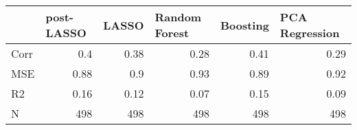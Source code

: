 
  \centering
    \begin{tabular}{lrrrrr}
    \midrule
    \midrule
          & \multicolumn{1}{l}{post-LASSO} & \multicolumn{1}{l}{LASSO} & \multicolumn{1}{l}{Random Forest} & \multicolumn{1}{l}{Boosting} & \multicolumn{1}{l}{PCA Regression} \\
    \midrule
    Corr  & 0.4   & 0.38  & 0.28  & 0.41  & 0.29 \\
    MSE   & 0.88  & 0.9   & 0.93  & 0.89  & 0.92 \\
    R2    & 0.16  & 0.12  & 0.07  & 0.15  & 0.09 \\
    N     & 498   & 498   & 498   & 498   & 498 \\
    \bottomrule
    \bottomrule
    \end{tabular}%

